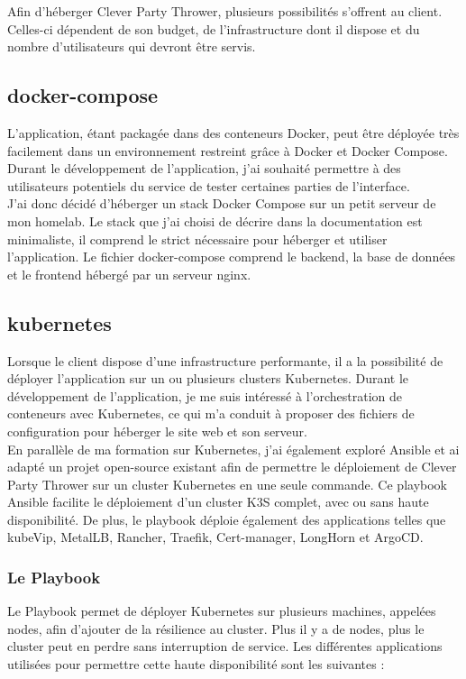 Afin d'héberger Clever Party Thrower, plusieurs possibilités s'offrent au client.
Celles-ci dépendent de son budget, de l'infrastructure dont il dispose et du nombre d'utilisateurs qui devront être servis.

\subsection{docker-compose}\label{subsec:docker-compose}
L'application, étant packagée dans des conteneurs Docker, peut être déployée très facilement dans un environnement restreint grâce à Docker et Docker Compose.
Durant le développement de l'application, j'ai souhaité permettre à des utilisateurs potentiels du service de tester certaines parties de l'interface.\\

J'ai donc décidé d'héberger un stack Docker Compose sur un petit serveur de mon homelab.
Le stack que j'ai choisi de décrire dans la documentation est minimaliste, il comprend le strict nécessaire pour héberger et utiliser l'application.
Le fichier docker-compose comprend le backend, la base de données et le frontend hébergé par un serveur nginx.

\subsection{kubernetes}\label{subsec:kubernetes}
Lorsque le client dispose d'une infrastructure performante, il a la possibilité de déployer l'application sur un ou plusieurs clusters Kubernetes.
Durant le développement de l'application, je me suis intéressé à l'orchestration de conteneurs avec Kubernetes,
ce qui m'a conduit à proposer des fichiers de configuration pour héberger le site web et son serveur.\\

En parallèle de ma formation sur Kubernetes, j'ai également exploré Ansible et ai adapté un projet open-source existant afin de permettre le déploiement de Clever Party Thrower sur un cluster Kubernetes en une seule commande.
Ce playbook Ansible facilite le déploiement d'un cluster K3S complet, avec ou sans haute disponibilité.
De plus, le playbook déploie également des applications telles que kubeVip, MetalLB, Rancher, Traefik, Cert-manager, LongHorn et ArgoCD.

\subsubsection{Le Playbook}
Le Playbook permet de déployer Kubernetes sur plusieurs machines, appelées nodes, afin d'ajouter de la résilience au cluster.
Plus il y a de nodes, plus le cluster peut en perdre sans interruption de service.
Les différentes applications utilisées pour permettre cette haute disponibilité sont les suivantes : \\

